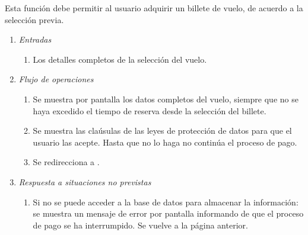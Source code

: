  \label{fun:iniciarpago}
	Esta función debe permitir al usuario adquirir un billete de vuelo, de acuerdo a la selección previa.

\begin{enumerate}
	\item \textit{Entradas}
	\begin{enumerate}
		\item Los detalles completos de la selección del vuelo.
	\end{enumerate}
	\item \textit{Flujo de operaciones}
	\begin{enumerate}
		\item Se muestra por pantalla los datos completos del vuelo, siempre que no se haya excedido el tiempo de reserva desde la selección del billete.
		\item Se muestra las claúsulas de las leyes de protección de datos para que el usuario las acepte. Hasta que no lo haga no continúa el proceso de pago.
		\item Se redirecciona a .
	\end{enumerate}
	\item \textit{Respuesta a situaciones no previstas}
	\begin{enumerate}
		\item Si no se puede acceder a la base de datos para almacenar la información: se muestra un mensaje de error por pantalla informando de que el proceso de pago se ha interrumpido. Se vuelve a la página anterior.
	\end{enumerate}
\end{enumerate}
